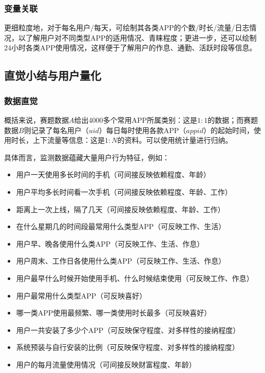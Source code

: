 \documentclass[withoutpreface,bwprint]{cumcmthesis}
\begin{document}
\subsubsection{变量关联}

更细粒度地，对于每名用户/每天，可绘制其各类APP的个数/时长/流量/日志情况，以了解用户对不同类型APP的适用情况、青睐程度；更进一步，还可以绘制24小时各类APP使用情况，这样便于了解用户的作息、通勤、活跃时段等信息。

\subsection{直觉小结与用户量化}

\subsubsection{数据直觉}
概括来说，赛题数据$A$给出4000多个常用APP所属类别：这是$1:1$的数据；而赛题数据$B$则记录了每名用户（$uid$）每日每时使用各款APP（$appid$）的起始时间，使用时长，上下流量等信息：这是$1:N$的资料。可以使用统计量进行归纳。

具体而言，监测数据蕴藏大量用户行为特征，例如：
\begin{itemize}
    \item 用户一天使用多长时间的手机（可间接反映依赖程度、年龄）
    \item 用户平均多长时间看一次手机（可间接反映依赖程度、年龄、工作）
    \item 距离上一次上线，隔了几天（可间接反映依赖程度、年龄、工作）
    \item 在什么星期几的时间段最常用什么类型APP（可反映工作、生活）
    \item 用户早、晚各使用什么类APP（可反映工作、生活、作息）
    \item 用户周末、工作日各使用什么类APP（可反映工作、生活、作息）
    \item 用户最早什么时候开始使用手机、什么时候结束使用（可反映工作、作息）
    \item 用户最常用什么类型APP（可反映喜好）
    \item 哪一类APP使用最频繁、哪一类使用时长最多（可反映喜好）
    \item 用户一共安装了多少个APP（可反映保守程度、对多样性的接纳程度）
    \item 系统预装与自行安装的比例（可反映保守程度、对多样性的接纳程度）
    \item 用户的每月流量使用情况（可间接反映财富程度、年龄）
\end{itemize}
\end{document}
